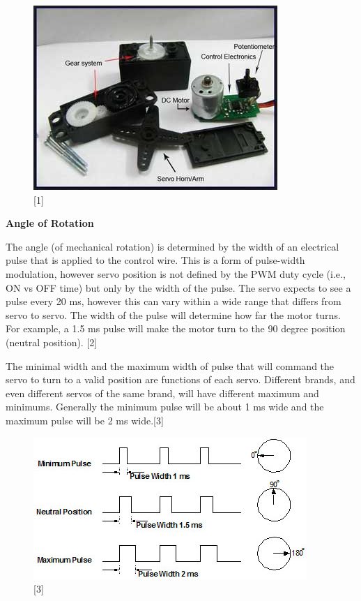 \documentclass[11pt,a4paper]{article}
\begin{document}
	\begin{figure}[h!]
		\includegraphics[scale=0.8]{sm.jpg}
		\centering
		\caption{[1]}
	\end{figure}
	 
	\newpage
	\flushleft
	\textbf{Angle of Rotation}
	
	The angle (of mechanical rotation) is determined by the width of an electrical pulse that is applied to the control wire. This is a form of pulse-width modulation, however servo position is not defined by the PWM duty cycle (i.e., ON vs OFF time) but only by the width of the pulse. The servo expects to see a pulse every 20 ms, however this can vary within a wide range that differs from servo to servo. The width of the pulse will determine how far the motor turns. For example, a 1.5 ms pulse will make the motor turn to the 90 degree position (neutral position). [2]
	

	
	The minimal width and the maximum width of pulse that will command the servo to turn to a valid position are functions of each servo. Different brands, and even different servos of the same brand, will have different maximum and minimums. Generally the minimum pulse will be about 1 ms wide and the maximum pulse will be 2 ms wide.[3]
	
	\begin{figure}[h!]
		\includegraphics[scale=0.7]{anr.jpg}
		\centering
		\caption{[3]}
	\end{figure}
	
\end{document}
